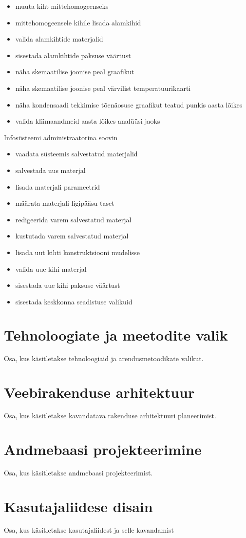 \begin{itemize}
    \item muuta kiht mittehomogeenseks
    \item mittehomogeensele kihile lisada alamkihid
    \item valida alamkihtide materjalid
    \item sisestada alamkihtide paksuse väärtust
    \item näha skemaatilise joonise peal graafikut
    \item näha skemaatilise joonise peal värvilist temperatuurikaarti
    \item näha kondensaadi tekkimise tõenäosuse graafikut teatud punkis aasta lõikes
    \item valida kliimaandmeid aasta lõikes analüüsi jaoks
\end{itemize}

Infosüsteemi administraatorina soovin
\begin{itemize}
    \item vaadata süsteemis salvestatud materjalid
    \item salvestada uus materjal
    \item lisada materjali parameetrid
    \item määrata materjali ligipääsu taset
    \item redigeerida varem salvestatud materjal
    \item kustutada varem salvestatud materjal
    \item lisada uut kihti konstruktsiooni mudelisse
    \item valida uue kihi materjal
    \item sisestada uue kihi paksuse väärtust
    \item sisestada keskkonna seadistuse valikuid
\end{itemize}



\section{Tehnoloogiate ja meetodite valik}
Osa, kus käsitletakse tehnoloogiaid ja arendusmetoodikate valikut.

\section{Veebirakenduse arhitektuur}
Osa, kus käsitletakse kavandatava rakenduse arhitektuuri planeerimist.

\section{Andmebaasi projekteerimine}
Osa, kus käsitletakse andmebaasi projekteerimist.

\section{Kasutajaliidese disain}
Osa, kus käsitletakse kasutajaliidest ja selle kavandamist